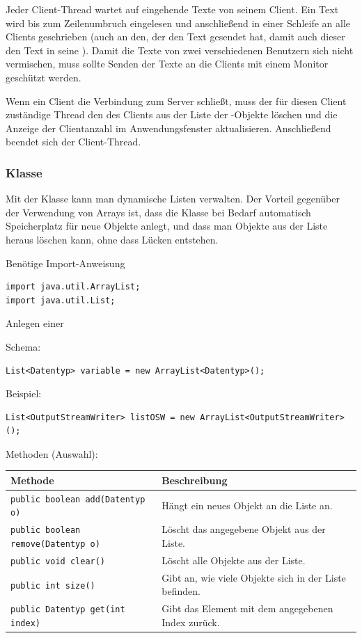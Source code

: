 Jeder Client-Thread wartet auf eingehende Texte von seinem Client. Ein Text
wird bis zum Zeilenumbruch eingelesen und anschließend in einer Schleife an
alle Clients geschrieben (auch an den, der den Text gesendet hat, damit auch
dieser den Text in seine ). Damit die Texte von zwei
verschiedenen Benutzern sich nicht vermischen, muss sollte Senden der Texte an
die Clients mit einem Monitor geschützt werden.

Wenn ein Client die Verbindung zum Server schließt, muss der für diesen Client
zuständige Thread den  des Clients aus der Liste der
-Objekte löschen und die Anzeige der Clientanzahl im
Anwendungsfenster aktualisieren. Anschließend beendet sich der Client-Thread.

\subsubsection{Klasse }

Mit der Klasse  kann man dynamische Listen verwalten. Der
Vorteil gegenüber der Verwendung von Arrays ist, dass die Klasse bei Bedarf
automatisch Speicherplatz für neue Objekte anlegt, und dass man Objekte aus der
Liste heraus löschen kann, ohne dass Lücken entstehen.

Benötige Import-Anweisung

\begin{lstlisting}
import java.util.ArrayList;
import java.util.List;
\end{lstlisting}

Anlegen einer 

Schema:

\begin{lstlisting}
List<Datentyp> variable = new ArrayList<Datentyp>();
\end{lstlisting}

Beispiel:

\begin{lstlisting}
List<OutputStreamWriter> listOSW = new ArrayList<OutputStreamWriter>();
\end{lstlisting}

Methoden (Auswahl):

\bgroup
\def\arraystretch{1.2}
\begin{tabularx}{\textwidth}{|p{65mm}|X|}
\hline
\textbf{Methode} &
\textbf{Beschreibung}
\\ \hline
\lstinline|public boolean add(Datentyp o)| &
Hängt ein neues Objekt an die Liste an.
\\ \hline
\lstinline|public boolean remove(Datentyp o)| &
Löscht das angegebene Objekt aus der Liste.
\\ \hline
\lstinline|public void clear()| &
Löscht alle Objekte aus der Liste.
\\ \hline
\lstinline|public int size()| &
Gibt an, wie viele Objekte sich in der Liste befinden.
\\ \hline
\lstinline|public Datentyp get(int index)| &
Gibt das Element mit dem angegebenen Index zurück.
\\ \hline
\end{tabularx}
\egroup
